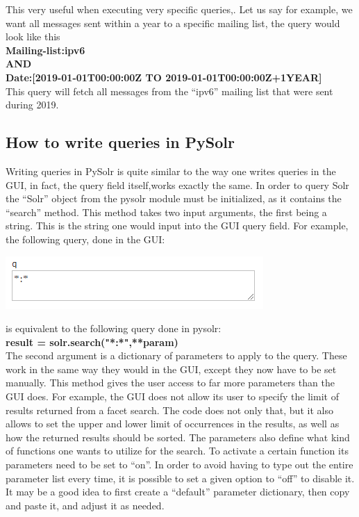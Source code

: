 \documentclass[a4paper,english]{report}
\begin{document}
This very useful when executing very specific queries,. Let us say for example, we want all messages sent within a year to a specific mailing list, the query would look like this\\

\noindent
\textbf{Mailing-list:ipv6\\ AND\\ Date:[2019-01-01T00:00:00Z TO 2019-01-01T00:00:00Z+1YEAR]}\\

This query will fetch all messages from the “ipv6” mailing list that were sent during 2019.






\subsection{How to write queries in PySolr}

Writing queries in PySolr is quite similar to the way one writes queries in the GUI, in fact, the query field itself,works exactly the same. In order to query Solr the “Solr” object from the pysolr module must be initialized, as it contains the “search” method. This method takes two input arguments, the first being a string. This is the string one would input into the GUI query field.
For example, the following query, done in the GUI:

\includegraphics{gui1}

is equivalent to the following query done in pysolr:\\



\textbf{result = solr.search("*:*",**param)}\\

The second argument is a dictionary of parameters to apply to the query. These work in the same way they would in the GUI, except they now have to be set manually. This method gives the user access to far more parameters than the GUI does.
For example, the GUI does not allow its user to specify the limit of results returned from a facet search. The code does not only that, but it also allows to set the upper and lower limit of occurrences in the results, as well as how the returned results should be sorted. 
The parameters also define what kind of functions one wants to utilize for the search. To activate a certain function its parameters need to be set to “on”. In order to avoid having to type out the entire parameter list every time, it is possible to set a given option to “off” to disable it. It may be a good idea to first create a “default” parameter dictionary, then copy and paste it, and adjust it as needed.\\
\end{document}
